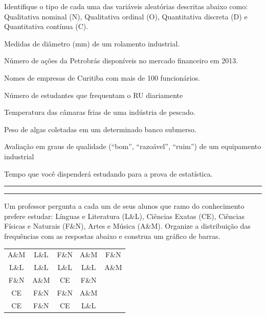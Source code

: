 \documentclass[a4paper,11pt,fleqn]{article}\usepackage[]{graphicx}\usepackage[]{color}
\theoremstyle{definition}
\begin{document}
\begin{compactenum}[4.]
\item Identifique o tipo de cada uma das variáveis aleatórias descritas
  abaixo como: Qualitativa nominal (N), Qualitativa ordinal
  (O), Quantitativa discreta (D) e Quantitativa contínua (C).
  \begin{compactenum}
   \item Medidas de diâmetro (mm) de um rolamento industrial.
   \item Número de ações da Petrobrás disponíveis no mercado financeiro
     em 2013.
   \item Nomes de empresas de Curitiba com mais de 100 funcionários.
   \item Número de estudantes que frequentam o RU diariamente
   \item Temperatura das câmaras frias de uma indústria de pescado.
   \item Peso de algas coletadas em um determinado banco submerso.
   \item Avaliação em graus de qualidade (``bom'', ``razoável'',
     ``ruim'') de um equipamento industrial
   \item Tempo que você dispenderá estudando para a prova de
     estatística.
   \end{compactenum}
\end{compactenum}

\vspace{0.3cm}
\hrule
\vspace{0.3cm}

\clearpage

\vspace{0.3cm}
\hrule
\vspace{0.3cm}

\begin{compactenum}[5.]
\item Um professor pergunta a cada um de seus alunos que ramo do
  conhecimento prefere estudar: Línguas e Literatura (L\&L), Ciências
  Exatas (CE), Ciências Físicas e Naturais (F\&N), Artes e Música
  (A\&M). Organize a distribuição das frequências com as respostas
  abaixo e construa um gráfico de barras.
  \begin{table}[!h]
    \centering
    \begin{tabular}{ccccc}
      \hline
      A\&M & L\&L & F\&N & A\&M & F\&N \\
      L\&L & L\&L & L\&L & L\&L & A\&M\\
      F\&N & A\&M & CE & F\&N & \\
      CE & F\&N & F\&N & A\&M & \\
      CE & F\&N & CE & L\&L \\
      \hline
    \end{tabular}
  \end{table}
\end{compactenum}
\end{document}
